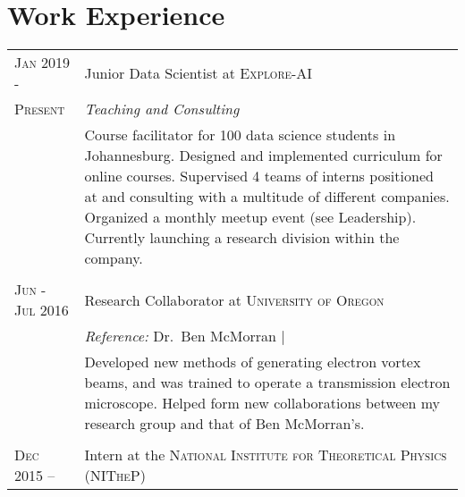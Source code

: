 \section{Work Experience}

\begin{supertabular}{l|p{11cm}}
	\textsc{Jan 2019 -}  		& Junior Data Scientist at \textsc{Explore-AI} \\
	\textsc{Present}			& \emph{Teaching and Consulting} \\
								& \footnotesize{Course facilitator for 100 data science students in Johannesburg. Designed and implemented curriculum for online courses. Supervised 4 teams of interns positioned at and consulting with a multitude of different companies. Organized a monthly meetup event (see Leadership). Currently launching a research division within the company.} \\
	 \\
	\textsc{Jun - Jul 2016}    	& Research Collaborator at \textsc{University of Oregon} \\
	 							& \emph{Reference:} Dr.\ Ben McMorran | \\
	 							& \footnotesize{Developed new methods of generating electron vortex beams, and was trained to operate a transmission electron microscope. Helped form new collaborations between my research group and that of Ben McMorran’s.}\\
	 \\
	\textsc{Dec 2015 --} 		& Intern at the \textsc{National Institute for Theoretical Physics (NITheP)} \\

\end{supertabular}
